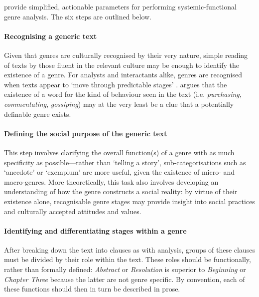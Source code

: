 \textcite{eggins_analysing_2004} provide simplified, actionable parameters for performing systemic\hyp{}functional genre analysis. The six steps are outlined below.

\paragraph{Recognising a generic text}

Given that genres are culturally recognised by their very nature, simple reading of texts by those fluent in the relevant culture may be enough to identify the existence of a genre. For analysts and interactants alike, genres are recognised when texts appear to `move through predictable stages' \parencite*[p.~213]{eggins_analysing_2004}. \textcite{eggins_introduction_2004} argues that the existence of a word for the kind of behaviour seen in the text (i.e. \emph{purchasing}, \emph{commentating}, \emph{gossiping}) may at the very least be a clue that a potentially definable genre exists.

\paragraph{Defining the social purpose of the generic text}

This step involves clarifying the overall function(s) of a genre with as much specificity as possible---rather than `telling a story', sub\hyp{}categorisations such as `anecdote' or `exemplum' are more useful, given the existence of micro- and macro\hyp{}genres. More theoretically, this task also involves developing an understanding of how the genre constructs a social reality: by virtue of their existence alone, recognisable genre stages may provide insight into social practices and culturally accepted attitudes and values. 

\paragraph{Identifying and differentiating stages within a genre}

After breaking down the text into clauses as with  analysis, groups of these clauses must be divided by their role within the text. These roles should be functionally, rather than formally defined: \emph{Abstract} or \emph{Resolution} is superior to \emph{Beginning} or \emph{Chapter Three} because the latter are not genre specific. By convention, each of these functions should then in turn be described in prose.

